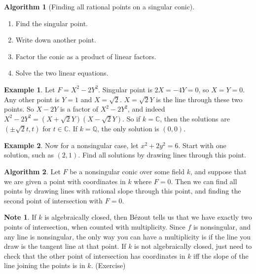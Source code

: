 \documentclass{article}
\newcommand{\Q}{\mathbb{Q}}
\newcommand{\C}{\mathbb{C}}
\newcommand{\rb}[1]{\left( #1 \right)}
\theoremstyle{definition}\newtheorem{definition}{Definition}[section]
\theoremstyle{definition}\newtheorem{remark}[definition]{Remark}
\theoremstyle{definition}\newtheorem*{example}{Example}
\theoremstyle{definition}\newtheorem*{note}{Note}
\newtheorem{algorithm}[definition]{Algorithm}
\begin{document}
\begin{algorithm}[Finding all rational points on a singular conic]
\hfill
\begin{enumerate}
\item Find the singular point.
\item Write down another point.
\item Factor the conic as a product of linear factors.
\item Solve the two linear equations.
\end{enumerate}
\end{algorithm}

\begin{example}
Let $ F = X^2 - 2Y^2 $. Singular point is $ 2X = -4Y = 0 $, so $ X = Y = 0 $. Any other point is $ Y = 1 $ and $ X = \sqrt{2} $. $ X = \sqrt{2}Y $ is the line through these two points. So $ X - 2Y $ is a factor of $ X^2 - 2Y^2 $, and indeed $ X^2 - 2Y^2 = \rb{X + \sqrt{2}Y}\rb{X - \sqrt{2}Y} $. So if $ k = \C $, then the solutions are $ \rb{\pm\sqrt{2}t, t} $ for $ t \in \C $. If $ k = \Q $, the only solution is $ \rb{0, 0} $.
\end{example}

\begin{example}
Now for a nonsingular case, let $ x^2 + 2y^2 = 6 $. Start with one solution, such as $ \rb{2, 1} $. Find all solutions by drawing lines through this point.
\end{example}

\begin{algorithm}
Let $ F $ be a nonsingular conic over some field $ k $, and suppose that we are given a point with coordinates in $ k $ where $ F = 0 $. Then we can find all points by drawing lines with rational slope through this point, and finding the second point of intersection with $ F = 0 $.
\end{algorithm}

\begin{note}
If $ k $ is algebraically closed, then Bézout tells us that we have exactly two points of intersection, when counted with multiplicity. Since $ f $ is nonsingular, and any line is nonsingular, the only way you can have a multiplicity is if the line you draw is the tangent line at that point. If $ k $ is not algebraically closed, just need to check that the other point of intersection has coordinates in $ k $ iff the slope of the line joining the points is in $ k $. (Exercise)
\end{note}

\end{document}
